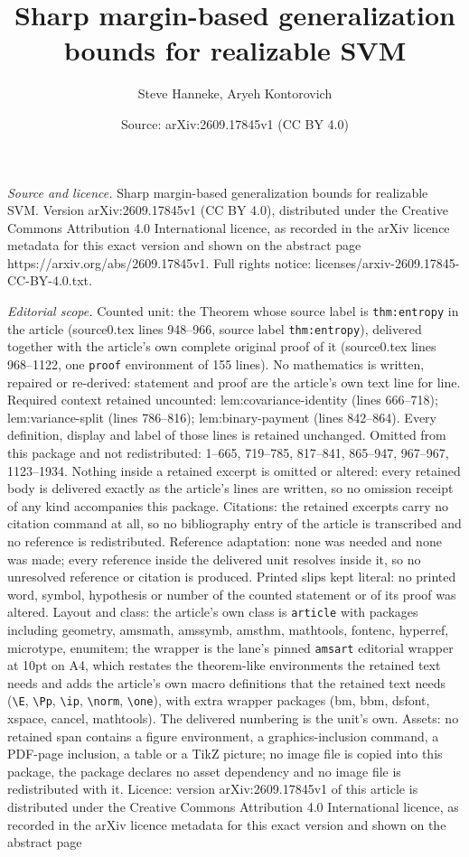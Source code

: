 \documentclass[10pt,a4paper]{amsart}
\title[Sharp margin-based generalization bounds for realizable SVM]{Sharp margin-based generalization bounds for realizable SVM}
\author{Steve Hanneke, Aryeh Kontorovich}
\date{Source: arXiv:2609.17845v1 (CC BY 4.0)}
\begin{document}
\maketitle

\noindent\emph{Source and licence.} Sharp margin-based generalization bounds for realizable SVM. Version arXiv:2609.17845v1 (CC BY 4.0), distributed under the Creative Commons Attribution 4.0 International licence, as recorded in the arXiv licence metadata for this exact version and shown on the abstract page https://arxiv.org/abs/2609.17845v1. Full rights notice: licenses/arxiv-2609.17845-CC-BY-4.0.txt.\par\smallskip

\noindent\textit{Editorial scope.} Counted unit: the Theorem whose source label is \texttt{thm:entropy} in the article (source0.tex lines 948--966, source label \texttt{thm:entropy}), delivered together with the article's own complete original proof of it (source0.tex lines 968--1122, one \texttt{proof} environment of 155 lines). No mathematics is written, repaired or re-derived: statement and proof are the article's own text line for line. Required context retained uncounted: lem:covariance-identity (lines 666--718); lem:variance-split (lines 786--816); lem:binary-payment (lines 842--864). Every definition, display and label of those lines is retained unchanged. Omitted from this package and not redistributed: 1--665, 719--785, 817--841, 865--947, 967--967, 1123--1934. Nothing inside a retained excerpt is omitted or altered: every retained body is delivered exactly as the article's lines are written, so no omission receipt of any kind accompanies this package. Citations: the retained excerpts carry no citation command at all, so no bibliography entry of the article is transcribed and no reference is redistributed. Reference adaptation: none was needed and none was made; every reference inside the delivered unit resolves inside it, so no unresolved reference or citation is produced. Printed slips kept literal: no printed word, symbol, hypothesis or number of the counted statement or of its proof was altered. Layout and class: the article's own class is \texttt{article} with packages including geometry, amsmath, amssymb, amsthm, mathtools, fontenc, hyperref, microtype, enumitem; the wrapper is the lane's pinned \texttt{amsart} editorial wrapper at 10pt on A4, which restates the theorem-like environments the retained text needs and adds the article's own macro definitions that the retained text needs (\texttt{\textbackslash E}, \texttt{\textbackslash Pp}, \texttt{\textbackslash ip}, \texttt{\textbackslash norm}, \texttt{\textbackslash one}), with extra wrapper packages (bm, bbm, dsfont, xspace, cancel, mathtools). The delivered numbering is the unit's own. Assets: no retained span contains a figure environment, a graphics-inclusion command, a PDF-page inclusion, a table or a TikZ picture; no image file is copied into this package, the package declares no asset dependency and no image file is redistributed with it. Licence: version arXiv:2609.17845v1 of this article is distributed under the Creative Commons Attribution 4.0 International licence, as recorded in the arXiv licence metadata for this exact version and shown on the abstract page 
\end{document}
